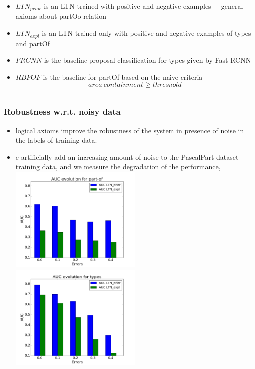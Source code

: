 \documentclass[xcolor=pdftex,dvipsnames,table]{beamer}
\begin{document}
\begin{frame}
\begin{columns}
\begin{column}{.55\textwidth}
    \begin{itemize}
      \item {\color{blue} $LTN_{prior}$ is an LTN trained with
          positive and negative examples + general
            axioms about partOo relation}
      \item {\color{green!50!black} $LTN_{expl}$ is an LTN trained
        only with  positive and negative
          examples of types and partOf}
      \item {\color{red} $FRCNN$ is the baseline proposal
      classification for types given by Fast-RCNN}
      \item {\color{red} $RBPOF$ is the baseline for partOf based
          on the naive criteria
          $$area\  containment \geq threshold$$}
    \end{itemize}
  \end{column}
\end{columns}  
\end{frame}
\begin{frame}
  \frametitle{Robustness w.r.t. noisy data}
  \begin{itemize}
    \item logical axioms improve the robustness of the system in
      presence of noise in the labels of training data.
    \item e artificially add an increasing amount of noise to the
      PascalPart-dataset training data, and we measure the
      degradation of the performance,
      \hspace*{-3em}
      \includegraphics[width=0.5\textwidth]{AP_part-of} 
       \includegraphics[width=0.5\textwidth]{AP_types}
    \end{itemize}
  \end{frame}  
\end{document}
